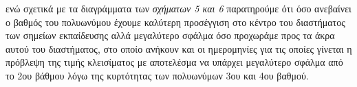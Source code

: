 \documentclass[Second Project.tex]{subfiles}
\begin{document}
ενώ σχετικά με τα διαγράμματα των \textit{σχήματων 5 και 6} παρατηρούμε ότι όσο ανεβαίνει ο βαθμός του 
πολυωνύμου έχουμε καλύτερη προσέγγιση στο κέντρο του διαστήματος των σημείων εκπαίδευσης αλλά μεγαλύτερο σφάλμα
όσο προχωράμε προς τα άκρα αυτού του διαστήματος, στο οποίο ανήκουν και οι ημερομηνίες για τις οποίες γίνεται
η πρόβλεψη της τιμής κλεισίματος με αποτελέσμα να υπάρχει μεγαλύτερο σφάλμα από το 2ου βάθμου λόγω της 
κυρτότητας των πολυωνύμων 3ου και 4ου βαθμού. 
\newpage
\end{document}
